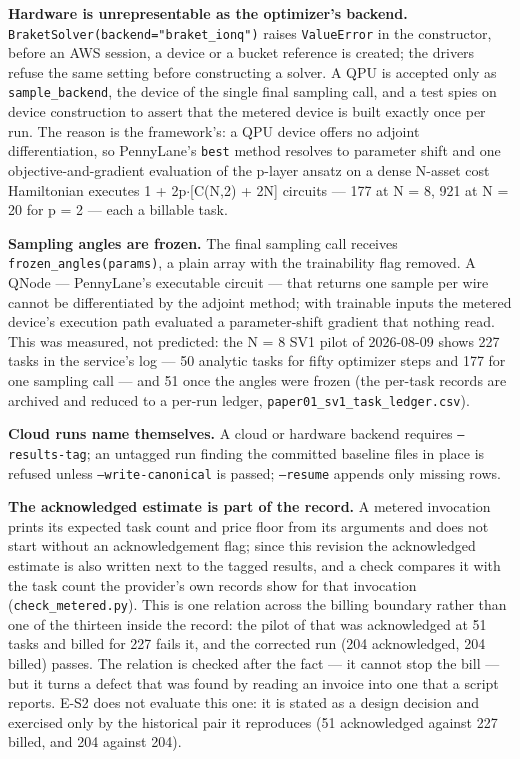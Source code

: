 \documentclass[acmsmall,screen,review]{acmart}
\begin{document}
\textbf{Hardware is unrepresentable as the optimizer's backend.} \texttt{Braket\allowbreak{}Solver(backend="braket\_\allowbreak{}ionq")} raises \texttt{ValueError} in the constructor, before an AWS session, a device or a bucket reference is created; the drivers refuse the same setting before constructing a solver. A QPU is accepted only as \texttt{sample\_backend}, the device of the single final sampling call, and a test spies on device construction to assert that the metered device is built exactly once per run. The reason is the framework's: a QPU device offers no adjoint differentiation, so PennyLane's \texttt{best} method resolves to parameter shift and one objective-and-gradient evaluation of the p-layer ansatz on a dense N-asset cost Hamiltonian executes 1 + 2p$\cdot$[C(N,2) + 2N] circuits --- 177 at N = 8, 921 at N = 20 for p = 2 --- each a billable task.


\textbf{Sampling angles are frozen.} The final sampling call receives \texttt{frozen\_\allowbreak{}angles(params)}, a plain array with the trainability flag removed. A QNode --- PennyLane's executable circuit --- that returns one sample per wire cannot be differentiated by the adjoint method; with trainable inputs the metered device's execution path evaluated a parameter-shift gradient that nothing read. This was measured, not predicted: the N = 8 SV1 pilot of 2026-08-09 shows 227 tasks in the service's log --- 50 analytic tasks for fifty optimizer steps and 177 for one sampling call --- and 51 once the angles were frozen (the per-task records are archived and reduced to a per-run ledger, \texttt{paper01\_\allowbreak{}sv1\_\allowbreak{}task\_\allowbreak{}ledger.\allowbreak{}csv}).


\textbf{Cloud runs name themselves.} A cloud or hardware backend requires \texttt{--results-tag}; an untagged run finding the committed baseline files in place is refused unless \texttt{--write-canonical} is passed; \texttt{--resume} appends only missing rows.


\textbf{The acknowledged estimate is part of the record.} A metered invocation prints its expected task count and price floor from its arguments and does not start without an acknowledgement flag; since this revision the acknowledged estimate is also written next to the tagged results, and a check compares it with the task count the provider's own records show for that invocation (\texttt{check\_metered.py}). This is one relation across the billing boundary rather than one of the thirteen inside the record: the pilot of \cite{ref1} that was acknowledged at 51 tasks and billed for 227 fails it, and the corrected run (204 acknowledged, 204 billed) passes. The relation is checked after the fact --- it cannot stop the bill --- but it turns a defect that was found by reading an invoice into one that a script reports. E-S2 does not evaluate this one: it is stated as a design decision and exercised only by the historical pair it reproduces (51 acknowledged against 227 billed, and 204 against 204).
\end{document}
